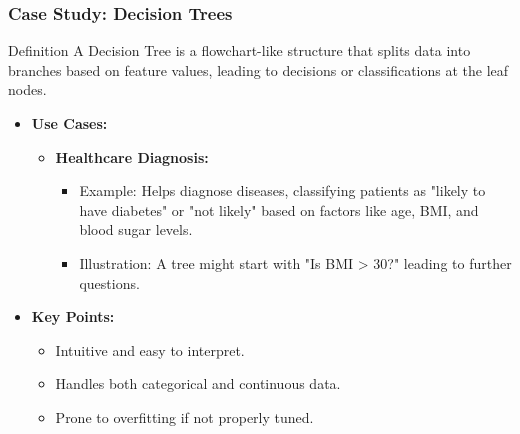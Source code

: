 \documentclass[aspectratio=169]{beamer}
\begin{document}
\begin{frame}[fragile]
    \frametitle{Case Study: Decision Trees}
    \begin{block}{Definition}
        A Decision Tree is a flowchart-like structure that splits data into branches based on feature values, leading to decisions or classifications at the leaf nodes.
    \end{block}
    
    \begin{itemize}
        \item \textbf{Use Cases:}
        \begin{itemize}
            \item \textbf{Healthcare Diagnosis:}
            \begin{itemize}
                \item Example: Helps diagnose diseases, classifying patients as "likely to have diabetes" or "not likely" based on factors like age, BMI, and blood sugar levels.
                \item Illustration: A tree might start with "Is BMI > 30?" leading to further questions.
            \end{itemize}
        \end{itemize}
        
        \item \textbf{Key Points:}
        \begin{itemize}
            \item Intuitive and easy to interpret.
            \item Handles both categorical and continuous data.
            \item Prone to overfitting if not properly tuned.
        \end{itemize}
    \end{itemize}
\end{frame}
\end{document}
